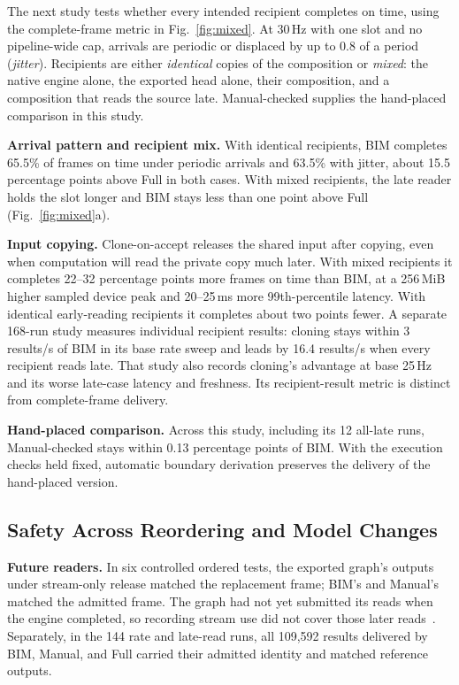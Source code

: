 \documentclass[conference]{IEEEtran}
\newcommand{\MiB}{\,MiB}
\newcommand{\ms}{\,ms}
\newcommand{\Hz}{\,Hz}
\begin{document}
The next study tests whether every intended recipient completes on time, using the complete-frame metric in Fig.~\ref{fig:mixed}. At 30\Hz{} with one slot and no pipeline-wide cap, arrivals are periodic or displaced by up to 0.8 of a period (\emph{jitter}). Recipients are either \emph{identical} copies of the composition or \emph{mixed}: the native engine alone, the exported head alone, their composition, and a composition that reads the source late. Manual-checked supplies the hand-placed comparison in this study.

\textbf{Arrival pattern and recipient mix.} With identical recipients, BIM completes 65.5\% of frames on time under periodic arrivals and 63.5\% with jitter, about 15.5 percentage points above Full in both cases. With mixed recipients, the late reader holds the slot longer and BIM stays less than one point above Full (Fig.~\ref{fig:mixed}a).

\textbf{Input copying.} Clone-on-accept releases the shared input after copying, even when computation will read the private copy much later. With mixed recipients it completes 22--32 percentage points more frames on time than BIM, at a 256\MiB{} higher sampled device peak and 20--25\ms{} more 99th-percentile latency. With identical early-reading recipients it completes about two points fewer. A separate 168-run study measures individual recipient results: cloning stays within 3 results/s of BIM in its base rate sweep and leads by 16.4 results/s when every recipient reads late. That study also records cloning's advantage at base 25\Hz{} and its worse late-case latency and freshness. Its recipient-result metric is distinct from complete-frame delivery.

\textbf{Hand-placed comparison.} Across this study, including its 12 all-late runs, Manual-checked stays within 0.13 percentage points of BIM. With the execution checks held fixed, automatic boundary derivation preserves the delivery of the hand-placed version.

\subsection{Safety Across Reordering and Model Changes}
\label{sec:eval-safety}

\textbf{Future readers.} In six controlled ordered tests, the exported graph's outputs under stream-only release matched the replacement frame; BIM's and Manual's matched the admitted frame. The graph had not yet submitted its reads when the engine completed, so recording stream use did not cover those later reads~\cite{recordstream}. Separately, in the 144 rate and late-read runs, all 109,592 results delivered by BIM, Manual, and Full carried their admitted identity and matched reference outputs.
\end{document}
